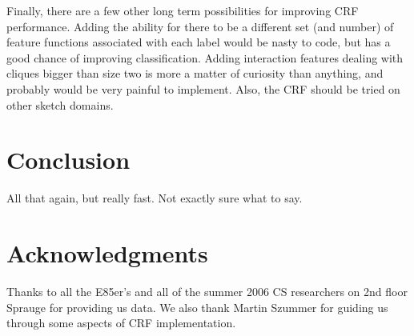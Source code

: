 \documentclass[10pt]{acmsiggraph}               %
\begin{document}
Finally, there are a few other long term possibilities for improving CRF performance.  Adding the ability 
for there to be a different set (and number) of feature functions associated with each label would be nasty to code,
but has a good chance of improving classification.
Adding interaction features dealing with cliques bigger than size two is more a matter of curiosity than anything, and probably would be very painful to implement.
Also, the CRF should be tried on other sketch domains.

\section{Conclusion}

All that again, but really fast.  Not exactly sure what to say.

\section*{Acknowledgments}
Thanks to all the E85er's and all of the summer 2006 CS researchers on 2nd floor Sprauge
for providing us data.  We also thank Martin Szummer for guiding us through some aspects of
CRF implementation.



\end{document}
